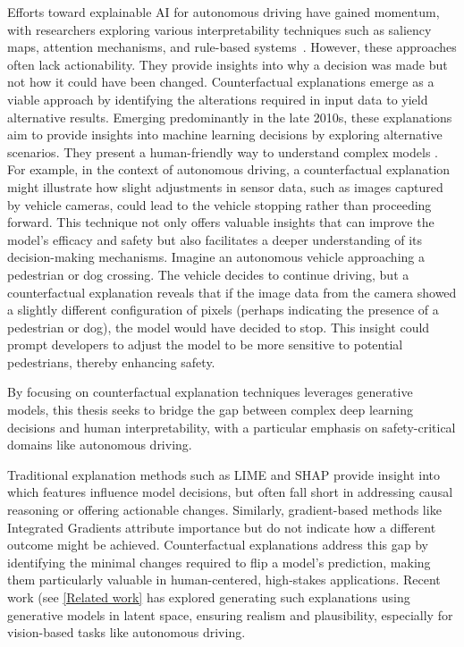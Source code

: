 Efforts toward explainable AI for autonomous driving have gained momentum, with researchers exploring various interpretability techniques such as saliency maps, attention mechanisms, and rule-based systems~\autocite{bojarski2016endendlearningselfdriving, Ribeiro2018}. However, these approaches often lack actionability. They provide insights into why a decision was made but not how it could have been changed. Counterfactual explanations emerge as a viable approach by identifying the alterations required in input data to yield alternative results. Emerging predominantly in the late 2010s, these explanations aim to provide insights into machine learning decisions by exploring alternative scenarios. They present a human-friendly way to understand complex models \autocite{yeshwanth2023counterfactual}. For example, in the context of autonomous driving, a counterfactual explanation might illustrate how slight adjustments in sensor data, such as images captured by vehicle cameras, could lead to the vehicle stopping rather than proceeding forward. This technique not only offers valuable insights that can improve the model's efficacy and safety but also facilitates a deeper understanding of its decision-making mechanisms. Imagine an autonomous vehicle approaching a pedestrian or dog crossing. The vehicle decides to continue driving, but a counterfactual explanation reveals that if the image data from the camera showed a slightly different configuration of pixels (perhaps indicating the presence of a pedestrian or dog), the model would have decided to stop. This insight could prompt developers to adjust the model to be more sensitive to potential pedestrians, thereby enhancing safety.

By focusing on counterfactual explanation techniques leverages generative models, this thesis seeks to bridge the gap between complex deep learning decisions and human interpretability, with a particular emphasis on safety-critical domains like autonomous driving.

Traditional explanation methods such as LIME and SHAP provide insight into which features influence model decisions, but often fall short in addressing causal reasoning or offering actionable changes. Similarly, gradient-based methods like Integrated Gradients attribute importance but do not indicate how a different outcome might be achieved. Counterfactual explanations address this gap by identifying the minimal changes required to flip a model’s prediction, making them particularly valuable in human-centered, high-stakes applications. Recent work (see \cref{Related work} has explored generating such explanations using generative models in latent space, ensuring realism and plausibility, especially for vision-based tasks like autonomous driving.




